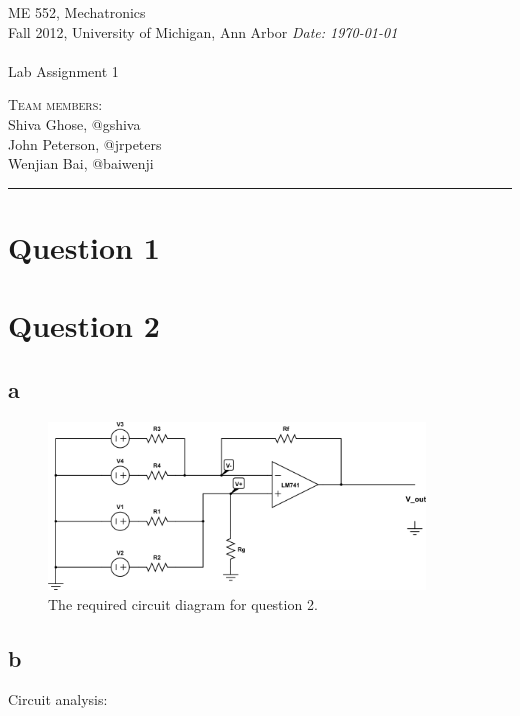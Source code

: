 \documentclass{article}
\newcommand{\shortbar}{\begin{center}\rule{5ex}{0.1pt}\end{center}}
\newcommand{\courseNumber}{ME 552}
\newcommand{\courseTitle}{Mechatronics}
\newcommand{\semester}{Fall 2012}
\theoremstyle{plain}
\theoremstyle{definition}
\theoremstyle{remark}
\newenvironment{solution}[1]{\medskip\noindent{\bf Problem #1.~}}{\shortbar}
\newcommand{\solutions}[4]{
\vspace{-2ex}
\begin{center}
{\small  \courseNumber, \courseTitle
\hfill {\Large \bf {#1} }\\
\semester, University of Michigan, Ann Arbor \hfill
{\em Date: #3}}\\
\vspace{-1ex}
\hrulefill\\
\vspace{4ex}
{\LARGE Lab Assignment #2}\\
\vspace{2ex}
\end{center}
\begin{trivlist}
\item \textsc{Team members:\\} {#4}
\end{trivlist}
\noindent
\shortbar
\vspace{3ex}
}
\begin{document}
\solutions{}{1}{\today}{Shiva Ghose, @gshiva\\ John Peterson, @jrpeters\\ Wenjian Bai, @baiwenji}
%
%

\section*{Question 1}



\section*{Question 2}

\subsection*{a}

\begin{figure}[h]
\begin{center}
\includegraphics[width=10cm]{q2_circuitDiagram.png}
\end{center}
\caption{The required circuit diagram for question 2.}
\label{q2_a}
\end{figure}


\subsection*{b}
Circuit analysis:\\
\end{document}
